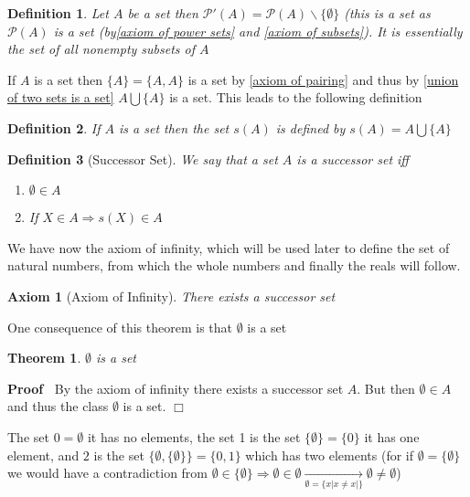 \documentclass{book}
\newcommand{\Rightarrowlim}{\mathop{\rightarrow}\limits}
\newenvironment{proof}{\noindent\textbf{Proof\ }}{\hspace*{\fill}$\Box$\medskip}
\newtheorem{axiom}{Axiom}
\newtheorem{definition}{Definition}
{\theorembodyfont{\rmfamily}\newtheorem{example}{Example}}
\newtheorem{theorem}{Theorem}
\begin{document}
{{\begin{definition}
  \label{P'(X)}{}Let $A$ be a set then $\mathcal{P}'
  (A) =\mathcal{P} (A) \backslash \{ \emptyset \}$ (this is a set as
  $\mathcal{P} (A)$ is a set (by\ref{axiom of power sets} and \ref{axiom of
  subsets}). It is essentially the set of all nonempty subsets of $A$
\end{definition}

If $A$ is a set then $\{ A \} = \{ A, A \}$ is a set by \ref{axiom of pairing}
and thus by \ref{union of two sets is a set} $A \bigcup \{ A \}$ is a set.
This leads to the following definition

\begin{definition}
  \label{successor of a set}{}If $A$ is a set then the set $s
  (A)$ is defined by $s (A) = A \bigcup \{ A \}$
\end{definition}

\begin{definition}[Successor Set]
  \label{successor set}{}We say that a set $A$ is a
  successor set iff
  \begin{enumerate}
    \item $\emptyset \in A$
    
    \item If $X \in A \Rightarrow s (X) \in A$
  \end{enumerate}
\end{definition}

We have now the axiom of infinity, which will be used later to define the set
of natural numbers, from which the whole numbers and finally the reals will
follow.

\begin{axiom}[Axiom of Infinity]
  \label{axiom of infinity}{}There exists a successor
  set
\end{axiom}

One consequence of this theorem is that $\emptyset$ is a set

\begin{theorem}
  \label{empty set is a set}$\emptyset$ is a set
\end{theorem}

\begin{proof}
  By the axiom of infinity there exists a successor set $A$. But then
  $\emptyset \in A$ and thus the class $\emptyset$ is a set.
\end{proof}

\begin{example}
  The set $0 = \emptyset$ it has no elements, the set 1 is the set $\{
  \emptyset \} = \{ 0 \}$ it has one element, and $2$ is the set $\{
  \emptyset, \{ \emptyset \} \} = \{ 0, 1 \}$ which has two elements (for if
  $\emptyset = \{ \emptyset \}$ we would have a contradiction from $\emptyset
  \in \{ \emptyset \} \Rightarrow \emptyset \in \emptyset
  \Rightarrowlim_{\emptyset = \{ x | x \neq x | \}} \emptyset \neq \emptyset$)
\end{example}

}}
\end{document}
